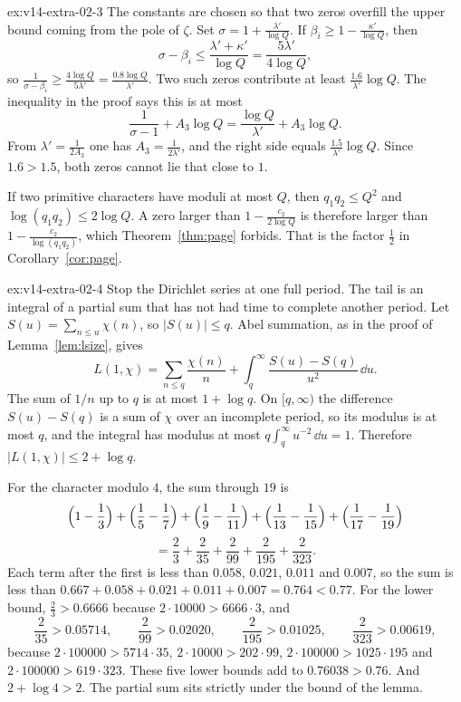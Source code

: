 \begin{solution}{ex:v14-extra-02-3}
\idea The constants are chosen so that two zeros overfill the upper bound coming from the pole of $\zeta$.
\writeup Set $\sigma=1+\frac{\lambda'}{\log Q}$. If $\beta_i\ge1-\frac{\kappa'}{\log Q}$, then
\[
\sigma-\beta_i\le\frac{\lambda'+\kappa'}{\log Q}=\frac{5\lambda'}{4\log Q},
\]
so $\frac1{\sigma-\beta_i}\ge\frac{4\log Q}{5\lambda'}=\frac{0.8\log Q}{\lambda'}$. Two such zeros contribute at least $\frac{1.6}{\lambda'}\log Q$. The inequality in the proof says this is at most
\[
\frac1{\sigma-1}+A_3\log Q=\frac{\log Q}{\lambda'}+A_3\log Q.
\]
From $\lambda'=\frac1{2A_3}$ one has $A_3=\frac1{2\lambda'}$, and the right side equals $\frac{1.5}{\lambda'}\log Q$. Since $1.6>1.5$, both zeros cannot lie that close to $1$.

If two primitive characters have moduli at most $Q$, then $q_1q_2\le Q^2$ and $\log(q_1q_2)\le2\log Q$. A zero larger than $1-\frac{c_2}{2\log Q}$ is therefore larger than $1-\frac{c_2}{\log(q_1q_2)}$, which Theorem~\ref{thm:page} forbids. That is the factor $\frac12$ in Corollary~\ref{cor:page}.
\end{solution}

\begin{solution}{ex:v14-extra-02-4}
\idea Stop the Dirichlet series at one full period. The tail is an integral of a partial sum that has not had time to complete another period.
\writeup Let $S(u)=\sum_{n\le u}\chi(n)$, so $|S(u)|\le q$. Abel summation, as in the proof of Lemma~\ref{lem:lsize}, gives
\[
L(1,\chi)=\sum_{n\le q}\frac{\chi(n)}n+\int_q^\infty\frac{S(u)-S(q)}{u^2}\,\dd u.
\]
The sum of $1/n$ up to $q$ is at most $1+\log q$. On $[q,\infty)$ the difference $S(u)-S(q)$ is a sum of $\chi$ over an incomplete period, so its modulus is at most $q$, and the integral has modulus at most $q\int_q^\infty u^{-2}\,\dd u=1$. Therefore $|L(1,\chi)|\le2+\log q$.

For the character modulo $4$, the sum through $19$ is
\[
\Bigl(1-\frac13\Bigr)+\Bigl(\frac15-\frac17\Bigr)+\Bigl(\frac19-\frac1{11}\Bigr)+\Bigl(\frac1{13}-\frac1{15}\Bigr)+\Bigl(\frac1{17}-\frac1{19}\Bigr)
\]
\[
=\frac23+\frac2{35}+\frac2{99}+\frac2{195}+\frac2{323}.
\]
Each term after the first is less than $0.058$, $0.021$, $0.011$ and $0.007$, so the sum is less than $0.667+0.058+0.021+0.011+0.007=0.764<0.77$. For the lower bound, $\frac23>0.6666$ because $2\cdot10000>6666\cdot3$, and
\[
\frac2{35}>0.05714,\qquad\frac2{99}>0.02020,\qquad\frac2{195}>0.01025,\qquad\frac2{323}>0.00619,
\]
because $2\cdot100000>5714\cdot35$, $2\cdot10000>202\cdot99$, $2\cdot100000>1025\cdot195$ and $2\cdot100000>619\cdot323$. These five lower bounds add to $0.76038>0.76$. And $2+\log4>2$. The partial sum sits strictly under the bound of the lemma.
\end{solution}

